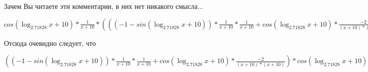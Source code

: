 \documentclass[12pt,a4paper,fleqn]{article}
\theoremstyle{definition}
\begin{document}
Зачем Вы читаете эти комментарии, в них нет никакого смысла...

$cos(\log_{ 2.71828 }{ x  +  10 }) * \frac{ 1 }{ x  +  10 }
 * ((( -1  - sin(\log_{ 2.71828 }{ x  +  10 })) * \frac{ 1 }{ x  +  10 }
 * \frac{ 1 }{ x  +  10 }
 + cos(\log_{ 2.71828 }{ x  +  10 }) * \frac{ -2 }{( x  +  10 ) * ( x  +  10 )}
) * { 3 }^{sin(\log_{ 2.71828 }{ x  +  10 })} + cos(\log_{ 2.71828 }{ x  +  10 }) * \frac{ 1 }{ x  +  10 }
 * cos(\log_{ 2.71828 }{ x  +  10 }) * \frac{ 1 }{ x  +  10 }
 * { 3 }^{sin(\log_{ 2.71828 }{ x  +  10 })}) = cos(\log_{ 2.71828 }{ x  +  10 }) * \frac{ 1 }{ x  +  10 }
 * ((( -1  - sin(\log_{ 2.71828 }{ x  +  10 })) * \frac{ 1 }{ x  +  10 }
 * \frac{ 1 }{ x  +  10 }
 + cos(\log_{ 2.71828 }{ x  +  10 }) * \frac{ -2 }{( x  +  10 ) * ( x  +  10 )}
) * { 3 }^{sin(\log_{ 2.71828 }{ x  +  10 })} + cos(\log_{ 2.71828 }{ x  +  10 }) * \frac{ 1 }{ x  +  10 }
 * cos(\log_{ 2.71828 }{ x  +  10 }) * \frac{ 1 }{ x  +  10 }
 * { 3 }^{sin(\log_{ 2.71828 }{ x  +  10 })})$

Отсюда очевидно следует, что

$(( -1  - sin(\log_{ 2.71828 }{ x  +  10 })) * \frac{ 1 }{ x  +  10 }
 * \frac{ 1 }{ x  +  10 }
 + cos(\log_{ 2.71828 }{ x  +  10 }) * \frac{ -2 }{( x  +  10 ) * ( x  +  10 )}
) * cos(\log_{ 2.71828 }{ x  +  10 }) * \frac{ 1 }{ x  +  10 }
 * { 3 }^{sin(\log_{ 2.71828 }{ x  +  10 })} + cos(\log_{ 2.71828 }{ x  +  10 }) * \frac{ 1 }{ x  +  10 }
 * ((( -1  - sin(\log_{ 2.71828 }{ x  +  10 })) * \frac{ 1 }{ x  +  10 }
 * \frac{ 1 }{ x  +  10 }
 + cos(\log_{ 2.71828 }{ x  +  10 }) * \frac{ -2 }{( x  +  10 ) * ( x  +  10 )}
) * { 3 }^{sin(\log_{ 2.71828 }{ x  +  10 })} + cos(\log_{ 2.71828 }{ x  +  10 }) * \frac{ 1 }{ x  +  10 }
 * cos(\log_{ 2.71828 }{ x  +  10 }) * \frac{ 1 }{ x  +  10 }
 * { 3 }^{sin(\log_{ 2.71828 }{ x  +  10 })}) = (( -1  - sin(\log_{ 2.71828 }{ x  +  10 })) * \frac{ 1 }{ x  +  10 }
 * \frac{ 1 }{ x  +  10 }
 + cos(\log_{ 2.71828 }{ x  +  10 }) * \frac{ -2 }{( x  +  10 ) * ( x  +  10 )}
) * cos(\log_{ 2.71828 }{ x  +  10 }) * \frac{ 1 }{ x  +  10 }
 * { 3 }^{sin(\log_{ 2.71828 }{ x  +  10 })} + cos(\log_{ 2.71828 }{ x  +  10 }) * \frac{ 1 }{ x  +  10 }
 * ((( -1  - sin(\log_{ 2.71828 }{ x  +  10 })) * \frac{ 1 }{ x  +  10 }
 * \frac{ 1 }{ x  +  10 }
 + cos(\log_{ 2.71828 }{ x  +  10 }) * \frac{ -2 }{( x  +  10 ) * ( x  +  10 )}
) * { 3 }^{sin(\log_{ 2.71828 }{ x  +  10 })} + cos(\log_{ 2.71828 }{ x  +  10 }) * \frac{ 1 }{ x  +  10 }
 * cos(\log_{ 2.71828 }{ x  +  10 }) * \frac{ 1 }{ x  +  10 }
 * { 3 }^{sin(\log_{ 2.71828 }{ x  +  10 })})$
\end{document}

